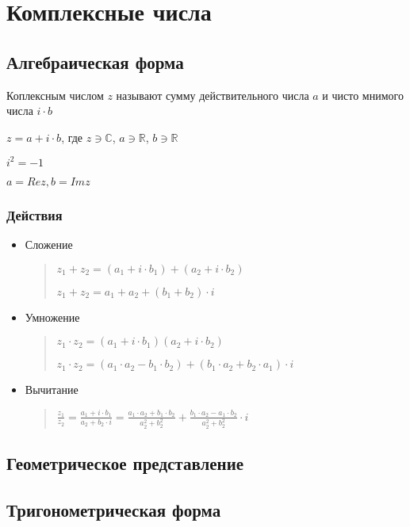 


\chapter{Комплексные числа}

\section{Алгебраическая форма}

\begin{definition}
    
    Коплексным числом $z$ называют сумму действительного числа $a$ и чисто мнимого числа $i \cdot b$

    $ z = a + i \cdot b $, где $ z \ni \mathbb{C}$, $a \ni \mathbb{R}$, $b \ni \mathbb{R}$

    $i^2 = -1$

    $a = Re z, b = Im z$
\end{definition}

\subsection*{Действия}

\begin{itemize}

    \item Сложение
    \begin{quotation}

        $z_1 + z_2 = (a_1 + i \cdot b_1) + (a_2 + i \cdot b_2)$

        $z_1 + z_2 = a_1 + a_2 + (b_1 + b_2) \cdot i$
    \end{quotation}
    

    \item Умножение
    \begin{quotation}
        $z_1 \cdot  z_2 = (a_{1} + i \cdot b_1)(a_2 + i \cdot b_2)$

    $z_1 \cdot  z_2  =(a_1 \cdot a_2 - b_1 \cdot b_2) + (b_1 \cdot a_2 + b_2 \cdot a_1) \cdot i$
    \end{quotation}
    


    \item Вычитание
    \begin{quotation}
        $ \frac{z_1}{z_2} = \frac{a_1 + i \cdot b_1}{a_2 + b_2 \cdot i} = \frac{a_1 \cdot a_2 + b_1 \cdot b_2}{a_2^2 + b_2^2} + \frac{b_1 \cdot a_2 - a_1 \cdot b_2}{a_2^2 + b_2^2} \cdot i$
    \end{quotation}

\end{itemize}

\section{Геометрическое представление}

\section{Тригонометрическая форма}

\begin{definition}

    
\end{definition}

\task{}







